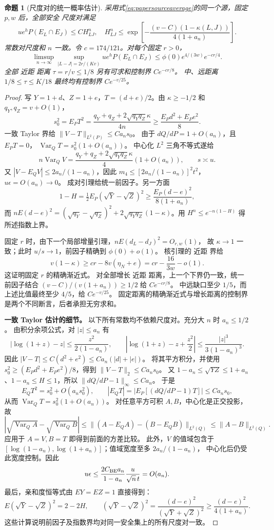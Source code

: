 \documentclass[UTF8,a4paper,11pt,fontset=fandol]{ctexart}
\newtheorem{proposition}[lemma]{命题}
\theoremstyle{remark}
\begin{document}
\begin{proposition}[尺度对的统一概率估计]\label{prop:paperallpairs}
采用式\eqref{eq:papersourceaverage}的同一个源，固定 $p,w$ 后，全部安全
尺度对满足
\[
 ue^hP(E_L\cap E_J)\le C H_{LJ}^n,
 \quad H_{LJ}^n\le
 \exp\!\left[-\frac{(v-C)(1-\kappa(L,J))}{4(1+a_n)}\right].
\]
常数对尺度和 $n$ 一致。令 $c=174/121$。对每个固定 $r>0$，
\[
 \limsup_{n\to\infty}\sup_{|L-J|=2r/(Kv)}ue^hP(E_L\cap E_J)
 \le\phi(0)e^{4/(3w)}e^{-cr/4}.
\]
全部 近距 距离 $\tau=r/v\le1/8$ 另有可求和控制界 $Ce^{-cr/8}$。
中、远距离 $1/8\le\tau\le K/18$ 最终均有控制界 $Ce^{-v/25}$。
\end{proposition}
\begin{proof}
写 $Y=1+d$、$Z=1+e$，$T=(d+e)/2$。由 $\kappa\ge-1/2$ 和
$q_Y,q_Z=v+O(1)$，
\[
 s_0^2=E_PT^2=\frac{q_Y+q_Z+2\sqrt{q_Yq_Z}\kappa}{4n}
 \ge\frac{E_Pd^2+E_Pe^2}{8}.
\]
一致 Taylor 界给 $\|V-T\|_{L^2(P)}\le Ca_ns_0$。
由于 $dQ/dP=1+O(a_n)$，且 $E_PT=0$，
$\operatorname{Var}_QT=s_0^2(1+O(a_n))$。
中心化 $L^2$ 三角不等式遂给
\[
 n\operatorname{Var}_QV
 =\frac{q_Y+q_Z+2\sqrt{q_Yq_Z}\kappa}{4}(1+O(a_n)),
 \qquad s\asymp u.
\]
又 $|V-E_QV|\le2a_n/(1-a_n)$，因此
$m_4\le[2a_n/(1-a_n)]^2t^2$，$u\epsilon=O(a_n)\to0$。
成对引理给统一前因子。另一方面
\[
 1-H=\tfrac12E_P(\sqrt Y-\sqrt Z)^2
 \ge\frac{E_P(d-e)^2}{8(1+a_n)},
\]
而 $nE(d-e)^2=(\sqrt{q_Y}-\sqrt{q_Z})^2+
2\sqrt{q_Yq_Z}(1-\kappa)$。用 $H^n\le e^{-n(1-H)}$ 得所述指数上界。

固定 $r$ 时，由下一个局部增量引理，$nE(d_L-d_J)^2=O_{r,w}(1)$，
故 $\kappa\to1$ 一致；此时 $u/s\to1$，前因子精确到 $\phi(0)+o(1)$。
核引理的 近距 界给
\[
 v(1-\kappa)\ge cr-8v(\eta_N+e)=cr-\frac{16}{3w}-o(1).
\]
这证明固定 $r$ 的精确渐近式。
对全部增长 近距 距离，上一个下界仍一致，统一前因子结合
$(v-C)/(v(1+a_n))\ge1/2$ 给 $Ce^{-cr/8}$。
中远缺口至少 $1/5$，而上述比值最终至少 $4/5$，给 $Ce^{-v/25}$。
固定距离的精确渐近式与增长距离的控制界是两个不同断言，后者承担无穷求和。

\medskip\noindent\textbf{一致 Taylor 估计的细节。}
以下所有常数均不依赖尺度对。充分大 $n$ 时 $a_n\le1/2$。
由积分余项公式，对 $|z|\le a_n$ 有
\[
 |\log(1+z)-z|\le\frac{z^2}{2(1-a_n)},\qquad
 \left|\log(1+z)-z+\frac{z^2}{2}\right|
 \le\frac{|z|^3}{3(1-a_n)^3}.
\]
因此 $|V-T|\le C(d^2+e^2)\le Ca_n(|d|+|e|)$。
将其平方积分，并使用 $s_0^2\ge(E_Pd^2+E_Pe^2)/8$，得到
$\|V-T\|_2\le Ca_ns_0$。
又 $1-a_n\le\sqrt{YZ}\le1+a_n$、$1-a_n\le H\le1$，所以
$\|dQ/dP-1\|_\infty\le Ca_n$。
于是
\[
 E_QT^2=s_0^2+O(a_ns_0^2),\qquad
 |E_QT|=|E_P[(dQ/dP-1)T]|\le Ca_ns_0,
\]
从而 $\operatorname{Var}_QT=s_0^2(1+O(a_n))$。
对任意平方可积 $A,B$，中心化是正交投影，故
\[
 |\sqrt{\operatorname{Var}_QA}-\sqrt{\operatorname{Var}_QB}|
 \le\|(A-E_QA)-(B-E_QB)\|_{L^2(Q)}
 \le\|A-B\|_{L^2(Q)}.
\]
应用于 $A=V,B=T$ 即得到前面的方差比较。
此外，$V$ 的值域包含于
$[\log(1-a_n),\log(1+a_n)]$；值域宽度至多 $2a_n/(1-a_n)$，
中心化后仍受此宽度控制。因此
\[
 u\epsilon\le\frac{2C_{\rm BE}a_n}{1-a_n}\frac{u}{\sqrt n\,t}
 =O(a_n).
\]
最后，亲和度恒等式由 $EY=EZ=1$ 直接得到：
\[
 E(\sqrt Y-\sqrt Z)^2=2-2H,
 \qquad(\sqrt Y-\sqrt Z)^2
 =\frac{(d-e)^2}{(\sqrt Y+\sqrt Z)^2}
 \ge\frac{(d-e)^2}{4(1+a_n)}.
\]
这些计算说明前因子及指数界均对同一安全集上的所有尺度对一致。

\end{proof}
\end{document}
